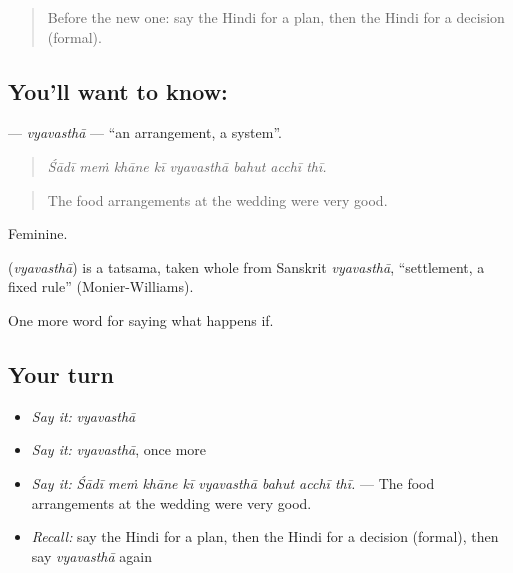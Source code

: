 \label{lesson:HI-C536-vyavastha}



\begin{quote}
Before the new one: say the Hindi for a plan, then the Hindi for a decision (formal).
\end{quote}

\subsection*{You'll want to know: }
\textbf{} — \emph{vyavasthā} — \textquotedblleft{}an arrangement, a system\textquotedblright{}.

\begin{quote}
       
\end{quote}

\begin{quote}
\emph{Śādī meṁ khāne kī vyavasthā bahut acchī thī.}
\end{quote}

\begin{quote}
The food arrangements at the wedding were very good.
\end{quote}

Feminine.

\begin{cousinweb}
\textbf{} (\emph{vyavasthā}) is a tatsama, taken whole from Sanskrit \emph{vyavasthā}, \textquotedblleft{}settlement, a fixed rule\textquotedblright{} (Monier-Williams).
\end{cousinweb}

\begin{grammarlens}[title={What you've built}]
One more word for saying what happens if.
\end{grammarlens}

\subsection*{Your turn}
\begin{itemize}
\raggedright
  \item \emph{Say it:} \emph{vyavasthā}
  \item \emph{Say it:} \emph{vyavasthā}, once more
  \item \emph{Say it:} \emph{Śādī meṁ khāne kī vyavasthā bahut acchī thī.} — The food arrangements at the wedding were very good.
  \item \emph{Recall:} say the Hindi for a plan, then the Hindi for a decision (formal), then say \emph{vyavasthā} again
\end{itemize}

